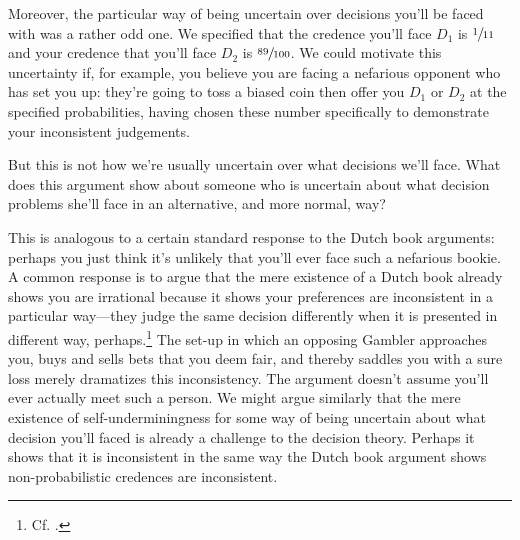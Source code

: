 \documentclass[a4paper]{article}
\newenvironment{CCM rewritten}
{\begingroup\color{blue}} %
{\endgroup}              %
\begin{document}
{
Moreover, the particular way of being uncertain over decisions you'll be faced with was a rather odd one. We specified that the credence you'll face $D_1$ is $\sfrac{1}{11}$ and your credence that you'll face $D_2$ is $\sfrac{89}{100}$. 
We could motivate this uncertainty if, for example, you believe you are facing a nefarious opponent who has set you up: they're going to toss a biased coin then offer you $D_1$ or $D_2$ at the specified probabilities, having chosen these number specifically to demonstrate your inconsistent judgements. 

But this is not how we're usually uncertain over what decisions we'll face. 
What does this argument show about someone who is uncertain about what decision problems she'll face in an alternative, and more normal, way? 

This is analogous to a certain standard response to the Dutch book arguments: perhaps you just think it's unlikely that you'll ever face such a nefarious bookie. A common response is to argue that the mere existence of a Dutch book already shows you are irrational because it shows your preferences are inconsistent in a particular way---they judge the same decision differently when it is presented in different way, perhaps.\footnote{Cf. \citep{armendt1993db,mahtani2014db}.} %
{The set-up in which an opposing Gambler approaches you, buys and sells bets that you deem fair, and thereby saddles you with a sure loss merely dramatizes this inconsistency.} The argument doesn't assume you'll ever actually meet such a person. We might argue similarly that the mere existence of self-underminingness for some way of being uncertain about what decision you'll faced is already a challenge to the decision theory. Perhaps it shows that it is inconsistent in the same way the Dutch book argument shows non-probabilistic credences are inconsistent.

}
\end{document}

